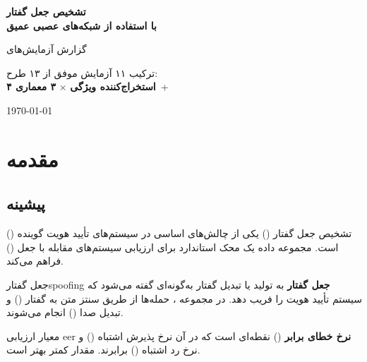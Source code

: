 \documentclass[12pt]{report}
\begin{document}
\begin{titlepage}
    \centering
    \vspace*{3cm}
    {\Huge\bfseries تشخیص جعل گفتار\\[0.5em]
    با استفاده از شبکه‌های عصبی عمیق\par}
    \vspace{1.5cm}
    {\Large گزارش آزمایش‌های \par}
    \vspace{2cm}
    \begin{tcolorbox}[
        enhanced,
        colback=amzchaptercolor!10!white,
        colframe=amzchaptercolor,
        boxrule=1pt,
        width=0.8\textwidth,
        center,
    ]
    \centering
    ترکیب ۱۱ آزمایش موفق از ۱۳ طرح:\\
    \textbf{۴ استخراج‌کننده ویژگی} × \textbf{۳ معماری}
    \,+\, \textbf{}
    \end{tcolorbox}
    \vfill
    {\large \today\par}
\end{titlepage}

\tableofcontents
\newpage

\chapter{مقدمه}

\section{پیشینه}

تشخیص جعل گفتار () یکی از چالش‌های اساسی در سیستم‌های تأیید هویت گوینده
() است. مجموعه داده  یک محک استاندارد برای ارزیابی
سیستم‌های مقابله با جعل () فراهم می‌کند.

\begin{dfnbox}{جعل گفتار}{spoofing}
    \textbf{جعل گفتار} به تولید یا تبدیل گفتار به‌گونه‌ای گفته می‌شود که سیستم تأیید هویت را
    فریب دهد. در مجموعه ، حمله‌ها از طریق سنتز متن به گفتار () و تبدیل
    صدا () انجام می‌شوند.
\end{dfnbox}

\begin{dfnbox}{معیار ارزیابی }{eer}
    \textbf{نرخ خطای برابر} () نقطه‌ای است که در آن نرخ پذیرش اشتباه
    () و نرخ رد اشتباه () برابرند. مقدار کمتر بهتر است.
\end{dfnbox}
\end{document}
